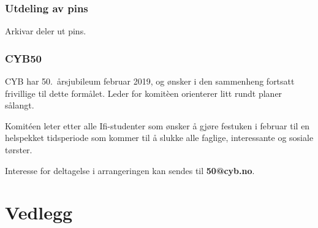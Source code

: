 \documentclass[10pt,norsk,a4paper]{article}
\begin{document}
\section{Utdeling av pins}

Arkivar deler ut pins.

\section{CYB50}

CYB har 50.~årsjubileum februar 2019, og ønsker i den sammenheng fortsatt frivillige til dette formålet. Leder for komitèen orienterer litt rundt planer sålangt.

Komitéen leter etter alle Ifi-studenter som ønsker å gjøre festuken i februar til en helspekket tidsperiode som kommer til å slukke alle faglige, interessante og sosiale tørster.

Interesse for deltagelse i arrangeringen kan sendes til \textbf{50@cyb.no}.


\part*{Vedlegg}\label{lastpage}

\newpage
{}

\end{document}

